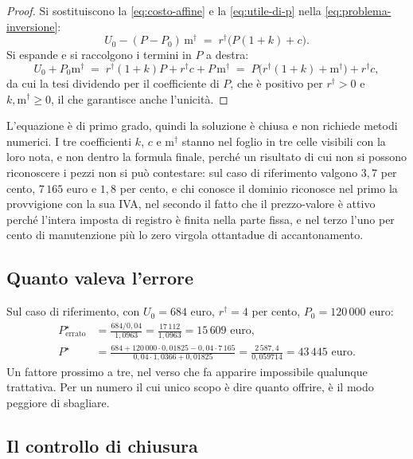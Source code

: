 \documentclass[11pt,a4paper]{article}
\theoremstyle{definition}
\theoremstyle{plain}
\begin{document}
\begin{proof}
Si sostituiscono la \eqref{eq:costo-affine} e la \eqref{eq:utile-di-p} nella \eqref{eq:problema-inversione}:
\[
U_0 - (P-P_0)\,\mathrm{m}^\dagger \;=\; r^\dagger\big(P(1+k)+c\big).
\]
Si espande e si raccolgono i termini in $P$ a destra:
\[
U_0 + P_0 \mathrm{m}^\dagger \;=\; r^\dagger(1+k)P + r^\dagger c + P\,\mathrm{m}^\dagger
\;=\; P\big(r^\dagger(1+k)+\mathrm{m}^\dagger\big) + r^\dagger c,
\]
da cui la tesi dividendo per il coefficiente di $P$, che è positivo per $r^\dagger>0$ e $k,\mathrm{m}^\dagger \ge 0$, il che garantisce anche l'unicità.
\end{proof}

L'equazione è di primo grado, quindi la soluzione è chiusa e non richiede metodi numerici. I tre coefficienti $k$, $c$ e $\mathrm{m}^\dagger$ stanno nel foglio in tre celle visibili con la loro nota, e non dentro la formula finale, perché un risultato di cui non si possono riconoscere i pezzi non si può contestare: sul caso di riferimento valgono $3{,}7$ per cento, $7\,165$ euro e $1{,}8$ per cento, e chi conosce il dominio riconosce nel primo la provvigione con la sua IVA, nel secondo il fatto che il prezzo-valore è attivo perché l'intera imposta di registro è finita nella parte fissa, e nel terzo l'uno per cento di manutenzione più lo zero virgola ottantadue di accantonamento.

\subsection{Quanto valeva l'errore}

Sul caso di riferimento, con $U_0 = 684$ euro, $r^\dagger = 4$ per cento, $P_0 = 120\,000$ euro:
\begin{align*}
P^\star_{\text{errato}} &= \frac{684/0{,}04}{1{,}0963} = \frac{17\,112}{1{,}0963} = 15\,609 \text{ euro},\\
P^\star &= \frac{684 + 120\,000\cdot 0{,}01825 - 0{,}04\cdot 7\,165}{0{,}04\cdot 1{,}0366 + 0{,}01825} = \frac{2\,587{,}4}{0{,}059714} = 43\,445 \text{ euro}.
\end{align*}
Un fattore prossimo a tre, nel verso che fa apparire impossibile qualunque trattativa. Per un numero il cui unico scopo è dire quanto offrire, è il modo peggiore di sbagliare.

\subsection{Il controllo di chiusura}
\end{document}
